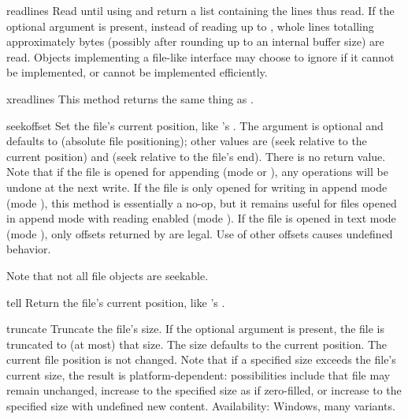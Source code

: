 \begin{methoddesc}[file]{readlines}{}
  Read until \EOF{} using  and return a list containing
  the lines thus read.  If the optional  argument is
  present, instead of reading up to \EOF, whole lines totalling
  approximately  bytes (possibly after rounding up to an
  internal buffer size) are read.  Objects implementing a file-like
  interface may choose to ignore  if it cannot be
  implemented, or cannot be implemented efficiently.
\end{methoddesc}

\begin{methoddesc}[file]{xreadlines}{}
  This method returns the same thing as .
\end{methoddesc}

\begin{methoddesc}[file]{seek}{offset}
  Set the file's current position, like 's .
  The  argument is optional and defaults to 
  (absolute file positioning); other values are  (seek
  relative to the current position) and  (seek relative to the
  file's end).  There is no return value.  Note that if the file is
  opened for appending (mode  or ), any
   operations will be undone at the next write.  If the
  file is only opened for writing in append mode (mode ),
  this method is essentially a no-op, but it remains useful for files
  opened in append mode with reading enabled (mode ).  If the
  file is opened in text mode (mode ), only offsets returned
  by  are legal.  Use of other offsets causes undefined
  behavior.

  Note that not all file objects are seekable.
\end{methoddesc}

\begin{methoddesc}[file]{tell}{}
  Return the file's current position, like 's
  .
\end{methoddesc}

\begin{methoddesc}[file]{truncate}{}
  Truncate the file's size.  If the optional  argument is
  present, the file is truncated to (at most) that size.  The size
  defaults to the current position.  The current file position is
  not changed.  Note that if a specified size exceeds the file's
  current size, the result is platform-dependent:  possibilities
  include that file may remain unchanged, increase to the specified
  size as if zero-filled, or increase to the specified size with
  undefined new content.
  Availability:  Windows, many \UNIX{} variants.
\end{methoddesc}


